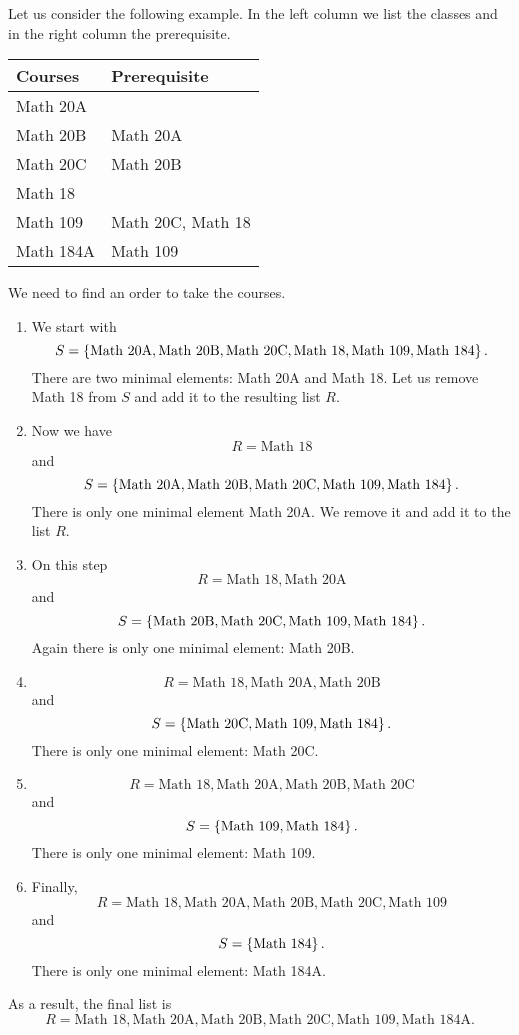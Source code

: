 Let us consider the following example. In the left column we list the classes
and in the right column the prerequisite.
\begin{center}
    \begin{tabular}{l l}
        \toprule
        Courses & Prerequisite \\
        \midrule
        Math 20A \\
        Math 20B & Math 20A \\
        Math 20C & Math 20B \\
        Math 18 \\
        Math 109 & Math 20C, Math 18 \\
        Math 184A & Math 109 \\
        \bottomrule
    \end{tabular}
\end{center}
We need to find an order to take the courses.
\begin{enumerate}
  \item We start with
    \[
      S = \set{\text{Math 20A}, \text{Math 20B},
        \text{Math 20C}, \text{Math 18}, \text{Math 109}, \text{Math 184}}.
    \]
    There are two minimal elements: Math 20A and Math 18. Let us remove Math 18
    from $S$ and add it to the resulting list $R$.
  \item Now we have
    \[
      R = \text{Math 18}
    \]
    and
    \[
      S = \set{\text{Math 20A},
      \text{Math 20B}, \text{Math 20C}, \text{Math 109}, \text{Math 184}}.
    \]
    There is only one minimal element Math 20A. We remove it and add it to the
    list $R$.
  \item On this step
    \[
      R = \text{Math 18}, \text{Math 20A}
    \]
    and
    \[
      S = \set{
        \text{Math 20B}, \text{Math 20C}, \text{Math 109}, \text{Math 184}}.
    \]
    Again there is only one minimal element: Math 20B.
  \item
    \[
      R = \text{Math 18}, \text{Math 20A}, \text{Math 20B}
    \] and
    \[
      S = \set{\text{Math 20C}, \text{Math 109}, \text{Math 184}}.
    \]
    There is only one minimal element: Math 20C.
  \item
    \[
      R = \text{Math 18}, \text{Math 20A}, \text{Math 20B}, \text{Math 20C}
    \]
    and
    \[
      S = \set{\text{Math 109}, \text{Math 184}}.
    \]
    There is only one minimal element: Math 109.
  \item Finally,
    \[
      R = \text{Math 18}, \text{Math 20A}, \text{Math 20B}, \text{Math 20C},
      \text{Math 109}
    \]
    and
    \[
      S = \set{\text{Math 184}}.
    \]
    There is only one minimal element: Math 184A.
\end{enumerate}
As a result, the final list is
\[
  R = \text{Math 18}, \text{Math 20A}, \text{Math 20B}, \text{Math 20C},
  \text{Math 109}, \text{Math 184A}.
\]


